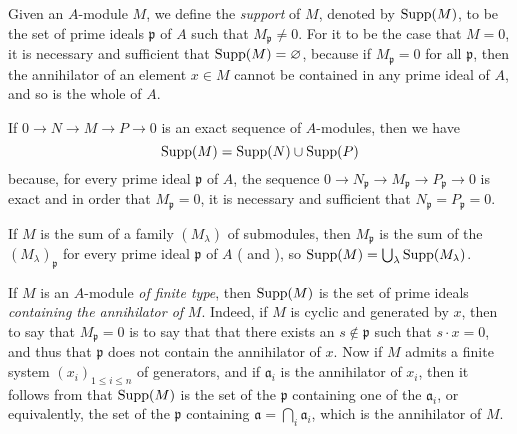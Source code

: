 \begin{env}[1.7.1]
\label{0.1.7.1}
Given an $A$-module $M$, we define the \emph{support} of $M$, denoted by ${\mathop{\mathrm{Supp}}\nolimits}(M)$, to be the set of prime ideals $\mathfrak{p}$ of $A$ such that $M_\mathfrak{p}\neq 0$.
For it to be the case that $M=0$, it is necessary and sufficient that ${\mathop{\mathrm{Supp}}\nolimits}(M)=\varnothing$, because if $M_\mathfrak{p}=0$ for all $\mathfrak{p}$, then the annihilator of an element $x\in M$ cannot be contained in any prime ideal of $A$, and so is the whole of $A$.
\end{env}

\begin{env}[1.7.2]
\label{0.1.7.2}
If $0\to N\to M\to P\to 0$ is an exact sequence of $A$-modules, then we have
\[
  {\mathop{\mathrm{Supp}}\nolimits}(M)={\mathop{\mathrm{Supp}}\nolimits}(N)\cup{\mathop{\mathrm{Supp}}\nolimits}(P)
\]
because, for every prime ideal $\mathfrak{p}$ of $A$, the sequence $0\to N_\mathfrak{p}\to M_\mathfrak{p}\to P_\mathfrak{p}\to 0$ is exact  and in order that $M_\mathfrak{p}=0$, it is necessary and sufficient that $N_\mathfrak{p}=P_\mathfrak{p}=0$.
\end{env}

\begin{env}[1.7.3]
\label{0.1.7.3}
If $M$ is the sum of a family $(M_\lambda)$ of submodules, then $M_\mathfrak{p}$ is the sum of the $(M_\lambda)_\mathfrak{p}$ for every prime ideal $\mathfrak{p}$ of $A$ ( and ), so ${\mathop{\mathrm{Supp}}\nolimits}(M)=\bigcup_\lambda{\mathop{\mathrm{Supp}}\nolimits}(M_\lambda)$.
\end{env}

\begin{env}[1.7.4]
\label{0.1.7.4}
If $M$ is an $A$-module \emph{of finite type}, then ${\mathop{\mathrm{Supp}}\nolimits}(M)$ is the set of prime ideals \emph{containing the annihilator of} $M$.
Indeed, if $M$ is cyclic and generated by $x$, then to say that $M_\mathfrak{p}=0$ is to say that that there exists an $s\not\in\mathfrak{p}$ such that $s\cdot x=0$, and thus that $\mathfrak{p}$ does not contain the annihilator of $x$.
Now if $M$ admits a finite system $(x_i)_{1\leq i\leq n}$ of generators, and if $\mathfrak{a}_i$ is the annihilator of $x_i$, then it follows from  that ${\mathop{\mathrm{Supp}}\nolimits}(M)$ is
the set of the $\mathfrak{p}$ containing one of the $\mathfrak{a}_i$, or equivalently, the set of the $\mathfrak{p}$ containing $\mathfrak{a}=\bigcap_i\mathfrak{a}_i$, which is the annihilator of $M$.
\end{env}

